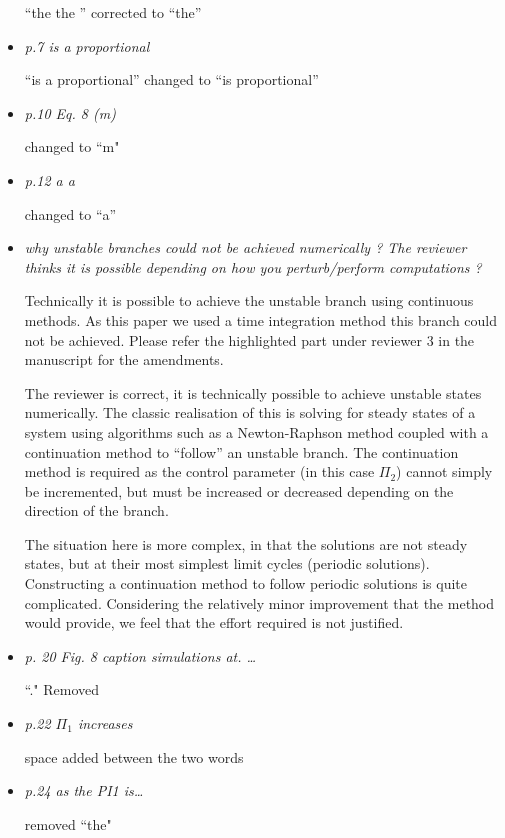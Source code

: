 \documentclass[]{article}
\begin{document}
\begin{itemize}
“the the ” corrected to “the”


\item \emph{p.7	is	a	proportional}

``is a proportional” changed to ``is proportional”

\item \emph{p.10	Eq.	8	(m)}

changed to ``m"

\item \emph{p.12 a a}

 changed to ``a”


\item \emph{why	unstable	branches	could	not	be	achieved	numerically	?	The	reviewer	thinks	
	it	is	possible	depending	on	how	you	perturb/perform	computations	?}

Technically it is possible to achieve the unstable branch using continuous methods. As this paper we used a time integration method this branch could not be achieved. Please refer the highlighted part under reviewer 3 in the manuscript for the amendments.

The reviewer is correct, it is technically possible to achieve unstable states numerically. The classic realisation of this is solving for steady states of a system using algorithms such as a Newton-Raphson method coupled with a continuation method to “follow” an unstable branch. The continuation method is required as the control parameter (in this case $\Pi_{2}$) cannot simply be incremented, but must be increased or decreased depending on the direction of the branch.

The situation here is more complex, in that the solutions are not steady states, but at their most simplest limit cycles (periodic solutions). Constructing a continuation method to follow periodic solutions is quite complicated. Considering the relatively minor improvement that the method would provide, we feel that the effort required is not justified.


\item \emph{p.	20 Fig.	8	caption	simulations	at.	…}

 ``." Removed 

\item \emph{p.22	$\Pi_{1}$ increases}

space added between the two words


\item \emph{p.24	as	the	PI1	is…}

removed ``the" 


\end{itemize}
\end{document}

